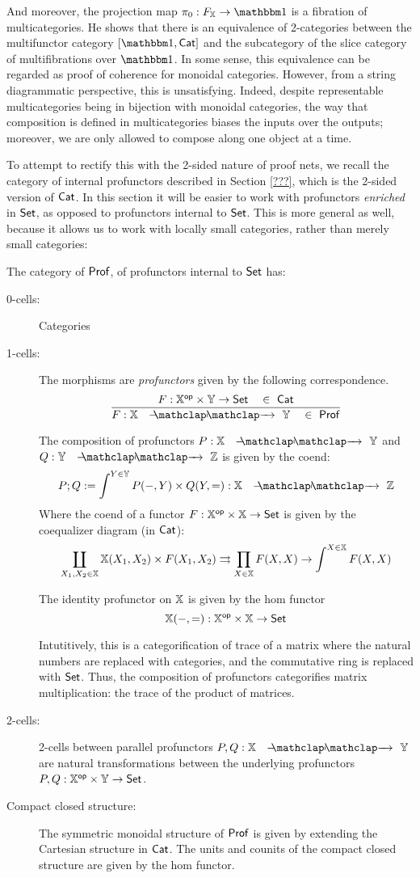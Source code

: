 And moreover, the projection map $\pi_0:F_\X\to \one$ is a fibration of multicategories.  He shows that there is an equivalence of 2-categories between the multifunctor category $[\one,\Cat]$ and the subcategory of the slice category of multifibrations over $\one$.  
In some sense, this equivalence can be regarded as proof of coherence for monoidal categories.
However, from a string diagrammatic perspective, this is unsatisfying.  Indeed, despite representable multicategories being in bijection with monoidal categories, the way that composition is defined in multicategories biases the inputs over the outputs; moreover, we are only allowed to compose along one object at a time.


To attempt to rectify this with the 2-sided nature of proof nets, we recall the category of internal profunctors described in Section \ref{???}, which is the 2-sided version of ${\sf Cat}$.  In this section it will be easier to work with profunctors {\em enriched} in $\mathsf{Set}$, as opposed to profunctors internal to $\mathsf{Set}$.  This is more general as well, because it allows us to work with locally small categories, rather than merely small categories:


\begin{definition}
The category of ${\sf Prof}$, of profunctors internal to $\mathsf{Set}$ has:
\begin{description}
\item[0-cells:] Categories
\item[1-cells:]  The morphisms are {\em profunctors} given by the following correspondence.
$$
\dfrac
{F:\X^\op\times\Y\to\Sets \quad \in\ \Cat}
{F:\X\proarrow \Y\quad \in\ \Prof}
$$

The composition of profunctors $P:\X\proarrow \Y$ and $Q:\Y\proarrow \Z$ is given by the coend:
$$
P;Q := \int^{Y \in \Y } P(-,Y) \times Q(Y,=):\X \proarrow \Z
$$
Where the coend of a functor $F:\mathbb{X}^{\mathsf{op}}\times\mathbb{X}\to \mathsf{Set}$ is given by the coequalizer diagram (in ${\sf Cat}$):
$$
\coprod_{X_1,X_2 \in \mathbb{X}} {\mathbb{X}}(X_1,X_2) \times F(X_1,X_2) \rightrightarrows \prod_{X \in \mathbb{X}} F(X,X) \to \int^{X \in \mathbb{X}} F(X,X)
$$


The identity profunctor on $\mathbb{X}$ is given by the hom functor
$$\mathbb{X}(-,=): \mathbb{X}^{\mathsf{op}}\times\mathbb{X}\to\mathsf{Set}$$


Intutitively, this is a categorification of trace of a matrix where the natural numbers are replaced with categories, and the commutative ring is replaced with $\mathsf{Set}$.  Thus, the composition of profunctors categorifies matrix multiplication: the trace of the product of matrices.


\item[2-cells:]  2-cells between parallel profunctors $P,Q:\X\proarrow \Y$ are natural transformations between the underlying profunctors $P,Q:\mathbb{X}^{\mathsf{op}}\times \mathbb{Y} \to \mathsf{Set}$.

\item[Compact closed structure:] The symmetric monoidal structure of ${\sf Prof}$ is given by extending the Cartesian structure in ${\sf Cat}$.   The units and counits of the compact closed structure are given by the hom functor.

\end{description}
\end{definition}


